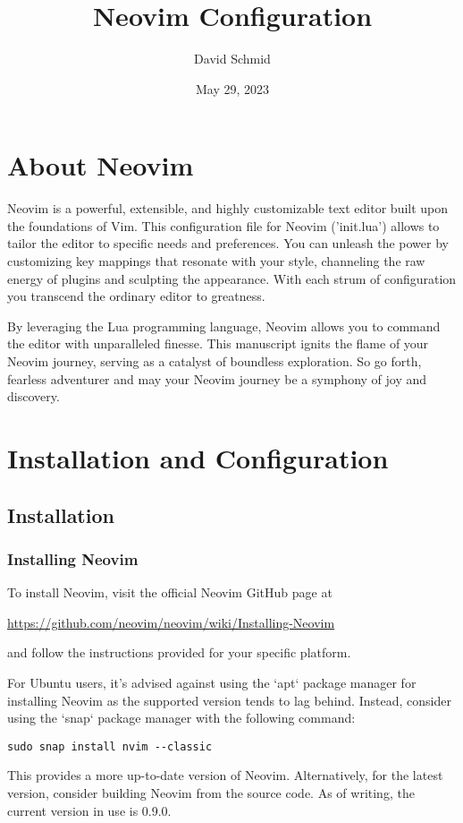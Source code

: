 \documentclass{article}
\title{Neovim Configuration}
\author{David Schmid}
\date{May 29, 2023}
\begin{document}
\maketitle

\section{About Neovim}

Neovim is a powerful, extensible, and highly customizable text editor built upon 
the foundations of Vim. This configuration file for Neovim ('init.lua') allows 
to tailor the editor to specific needs and preferences. You can unleash the 
power by customizing key mappings that resonate with your style, channeling 
the raw energy of plugins and sculpting the appearance. With each strum of 
configuration you transcend the ordinary editor to greatness.

By leveraging the Lua programming language, Neovim allows you to command the
editor with unparalleled finesse. This manuscript ignits the flame of your 
Neovim journey, serving as a catalyst of boundless exploration. So go forth, 
fearless adventurer and may your Neovim journey be a symphony of joy and 
discovery.

\section{Installation and Configuration}

\subsection{Installation}

\subsubsection{Installing Neovim}
To install Neovim, visit the official Neovim GitHub page at 

\href{https://github.com/neovim/neovim/wiki/Installing-Neovim}{https://github.com/neovim/neovim/wiki/Installing-Neovim} 

and follow the instructions provided for your specific platform.

For Ubuntu users, it's advised against using the `apt` package manager for 
installing Neovim as the supported version tends to lag behind. Instead, 
consider using the `snap` package manager with the following command:
\begin{verbatim}
sudo snap install nvim --classic
\end{verbatim}
This provides a more up-to-date version of Neovim. Alternatively, for the 
latest version, consider building Neovim from the source code. As of writing, 
the current version in use is 0.9.0.
\end{document}
